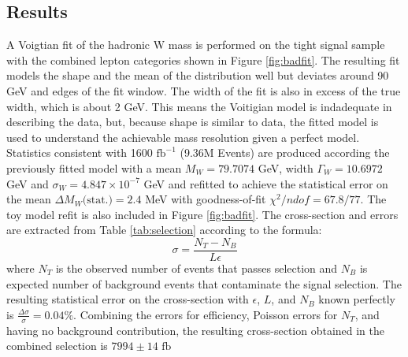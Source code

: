 \subsection{Results}
\label{subsec:wmass}

A Voigtian fit of the hadronic W mass is performed on the tight signal sample with the combined lepton categories shown in Figure \ref{fig:badfit}. The resulting fit models the shape and the mean of the distribution well but deviates around 90 GeV and edges of the fit window. The width of the fit is also in excess of the true width, which is about 2 GeV. This means the Voitigian model is indadequate in describing  the data, but, because shape is similar to data, the fitted model is used to understand the achievable mass resolution given a perfect model. Statistics consistent with 1600 $\text{fb}^{-1}$ (9.36M Events) are produced according the previously fitted model with a mean  $M_W = 79.7074$ GeV, width $\Gamma_W = 10.6972$ GeV and $\sigma_W = 4.847 \times 10^{-7}$ GeV and refitted to achieve the statistical error on the mean $\Delta M_W \text{(stat.)} = 2.4$ MeV with goodness-of-fit $\chi^2 / ndof = 67.8/77$. The toy model refit is also included in Figure \ref{fig:badfit}.
The cross-section and errors are extracted from Table \ref{tab:selection} according to the formula:
\begin{equation}
\sigma = \frac{N_T - N_B}{L \epsilon}
\end{equation}
where $N_T$ is the observed number of events that passes selection and $N_B$ is expected number of background events that contaminate the signal selection. The resulting statistical error on the cross-section with $\epsilon$, $L$, and $N_B$ known perfectly is $\frac{\Delta \sigma}{\sigma} = 0.04 \%$. Combining the errors for efficiency, Poisson errors for $N_T$, and having  no background contribution, the resulting cross-section obtained in the combined selection is $7994 \pm 14 \, \, \text{fb}$
